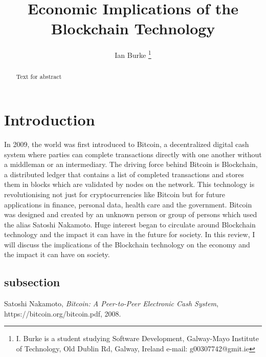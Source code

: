 \documentclass[report]{IEEEtran}
\begin{document}
\title{Economic Implications of the Blockchain Technology}
\author{Ian Burke %
\thanks{I. Burke is a student studying
Software Development, Galway-Mayo Institute of Technology, Old Dublin Rd, Galway, Ireland e-mail: g00307742@gmit.ie}%
}

\maketitle

\begin{abstract}
Text for abstract
\end{abstract}


\section{Introduction}
In 2009, the world was first introduced to Bitcoin, a decentralized digital cash system where parties can complete transactions directly with one another without a middleman or an intermediary. The driving force behind Bitcoin is Blockchain, a distributed ledger that contains a list of completed transactions and stores them in blocks which are validated by nodes on the network. This technology is revolutionising not just for cryptocurrencies like Bitcoin but for future applications in finance, personal data, health care and the government. Bitcoin was designed and created by an unknown person or group of persons which used the alias Satoshi Nakamoto. Huge interest began to circulate around Blockchain technology and the impact it can have in the future for society. In this review, I will discuss the implications of the Blockchain technology on the economy and the impact it can have on society.
\subsection{subsection}

\begin{thebibliography}{1}

Satoshi Nakamoto, \emph{Bitcoin: A Peer-to-Peer Electronic Cash System}, https://bitcoin.org/bitcoin.pdf, 2008.

\end{thebibliography}
\end{document}
